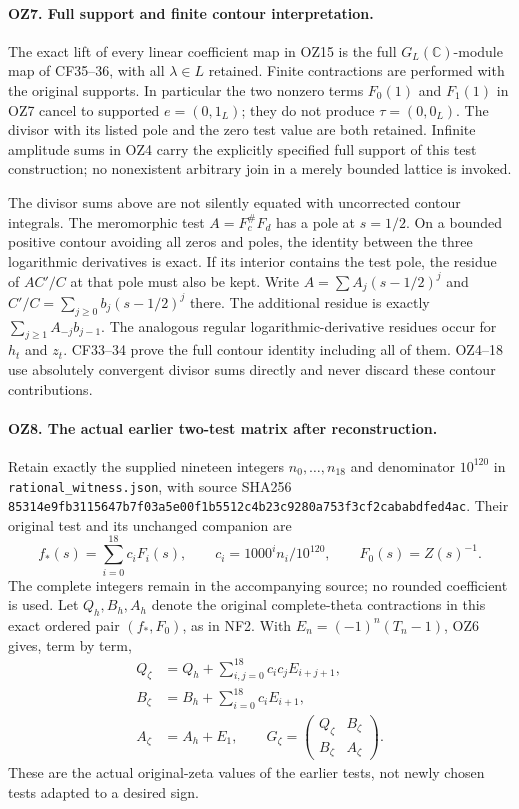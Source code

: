 \paragraph{OZ7. Full support and finite contour interpretation.}
The exact lift of every linear coefficient map in OZ15 is the
full \(G_L(\mathbb C)\)-module map of CF35--36, with all
\(\lambda\in L\) retained. Finite contractions are performed
with the original supports. In particular the two nonzero terms
\(F_0(1)\) and \(F_1(1)\) in OZ7 cancel to supported
\(e=(0,1_L)\); they do not produce \(\tau=(0,0_L)\).
The divisor with its listed pole and the zero test value are both
retained. Infinite amplitude sums in OZ4 carry the explicitly
specified full support of this test construction; no nonexistent
arbitrary join in a merely bounded lattice is invoked.

The divisor sums above are not silently equated with uncorrected
contour integrals. The meromorphic test \(A=F_c^\#F_d\) has a
pole at \(s=1/2\). On a bounded positive contour avoiding all
zeros and poles, the identity between the three logarithmic
derivatives is exact. If its interior contains the test pole,
the residue of \(A C'/C\) at that pole must also be kept.
Write \(A=\sum A_j(s-1/2)^j\) and
\(C'/C=\sum_{j\ge0}b_j(s-1/2)^j\) there. The additional
residue is exactly \(\sum_{j\ge1}A_{-j}b_{j-1}\).
The analogous regular logarithmic-derivative residues occur for
\(h_t\) and \(z_t\). CF33--34 prove the full contour identity
including all of them. OZ4--18 use absolutely convergent divisor
sums directly and never discard these contour contributions.

\paragraph{OZ8. The actual earlier two-test matrix after reconstruction.}
Retain exactly the supplied nineteen integers \(n_0,\ldots,n_{18}\)
and denominator \(10^{120}\) in
\texttt{rational\_witness.json}, with source SHA256
\nolinkurl{85314e9fb3115647b7f03a5e00f1b5512c4b23c9280a753f3cf2cababdfed4ac}.
Their original test and its unchanged companion are
\[
 f_*(s)=\sum_{i=0}^{18}c_iF_i(s),\qquad
 c_i=1000^i n_i/10^{120},\qquad F_0(s)=Z(s)^{-1}.
                                                               \tag{OZ19}
\]
The complete integers remain in the accompanying source; no
rounded coefficient is used. Let \(Q_h,B_h,A_h\) denote the
original complete-theta contractions in this exact ordered pair
\((f_*,F_0)\), as in NF2. With
\(E_n=(-1)^n(T_n-1)\), OZ6 gives, term by term,
\[
 \begin{split}
 Q_\zeta&=Q_h+\sum_{i,j=0}^{18}c_ic_jE_{i+j+1},\\
 B_\zeta&=B_h+\sum_{i=0}^{18}c_iE_{i+1},\\
 A_\zeta&=A_h+E_1,\qquad
 G_\zeta=\begin{pmatrix}Q_\zeta&B_\zeta\\B_\zeta&A_\zeta\end{pmatrix}.
 \end{split}\tag{OZ20}
\]
These are the actual original-zeta values of the earlier tests,
not newly chosen tests adapted to a desired sign.

